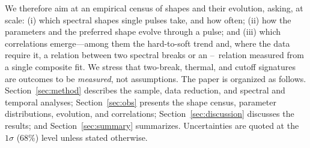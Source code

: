 We therefore aim at an empirical census of shapes and their evolution, asking, at
scale: (i) which spectral shapes single pulses take, and how often; (ii) how the
parameters and the preferred shape evolve through a pulse; and (iii) which
correlations emerge---among them the hard-to-soft trend \citep{Lu2012,Busby2024}
and, where the data require it, a relation between two spectral breaks or an
\Ep--\kT\ relation measured from a single composite fit. We stress that two-break,
thermal, and cutoff signatures are outcomes to be \emph{measured}, not assumptions.
The paper is organized as follows. Section~\ref{sec:method} describes the sample,
data reduction, and spectral and temporal analyses; Section~\ref{sec:obs} presents
the shape census, parameter distributions, evolution, and correlations;
Section~\ref{sec:discussion} discusses the results; and Section~\ref{sec:summary}
summarizes. Uncertainties are quoted at the $1\sigma$ (68\%) level unless stated
otherwise.
